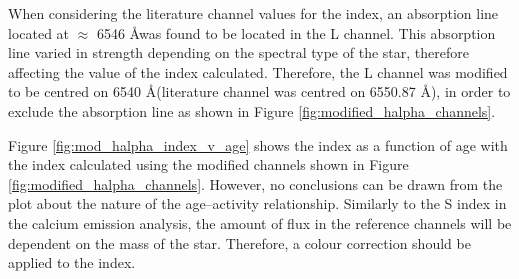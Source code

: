 When considering the literature channel values for the \Halpha index, an absorption line located at $\approx$ 6546 \AA \space was found to be located in the L channel. This absorption line varied in strength depending on the spectral type of the star, therefore affecting the value of the \Halpha index calculated. Therefore, the L channel was modified to be centred on 6540 \AA \space (literature channel was centred on 6550.87 \AA), in order to exclude the absorption line as shown in Figure \ref{fig:modified_halpha_channels}. 

Figure \ref{fig:mod_halpha_index_v_age} shows the \Halpha index as a function of age with the \Halpha index calculated using the modified channels shown in Figure \ref{fig:modified_halpha_channels}. However, no conclusions can be drawn from the plot about the nature of the age--activity relationship. Similarly to the S index in the calcium emission analysis, the amount of flux in the reference channels will be dependent on the mass of the star. Therefore, a colour correction should be applied to the \Halpha index.

